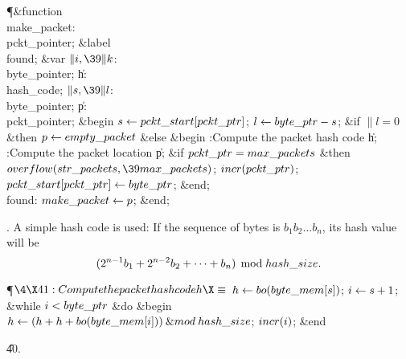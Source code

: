 \Y\P\4\&{function}\1\  \\{make\_packet}: \\{pckt\_pointer};\6
\4\&{label} \\{found};\6
\4\&{var} $\|i,\39\|k$: \\{byte\_pointer};\6
\|h: \\{hash\_code};\6
$\|s,\39\|l$: \\{byte\_pointer};\6
\|p: \\{pckt\_pointer};\2\6
\&{begin} $\|s\K\\{pckt\_start}[\\{pckt\_ptr}]$;\5
$\|l\K\\{byte\_ptr}-\|s$;\6
\&{if} $\|l=0$ \1\&{then}\5
$\|p\K\\{empty\_packet}$\6
\4\&{else} \&{begin} :Compute the packet hash code \|h\X;\6
:Compute the packet location \|p\X;\6
\&{if} $\\{pckt\_ptr}=\\{max\_packets}$ \1\&{then}\5
$\\{overflow}(\\{str\_packets},\39\\{max\_packets})$;\2\6
$\\{incr}(\\{pckt\_ptr})$;\5
$\\{pckt\_start}[\\{pckt\_ptr}]\K\\{byte\_ptr}$;\6
\&{end};\2\6
\4\\{found}: $\\{make\_packet}\K\|p$;\6
\&{end};\par
\fi

. A simple hash code is used: If the sequence of bytes is
$b_1b_2\ldots b_n$, its hash value will be
$$(2^{n-1}b_1+2^{n-2}b_2+\cdots+b_n)\,\bmod\,\\{hash\_size}.$$

\Y\P$\4\X41:Compute the packet hash code \|h\X\S$\6
$\|h\K\\{bo}(\\{byte\_mem}[\|s])$;\5
$\|i\K\|s+1$;\6
\&{while} $\|i<\\{byte\_ptr}$ \1\&{do}\6
\&{begin} $\|h\K(\|h+\|h+\\{bo}(\\{byte\_mem}[\|i]))\mathbin{\&{mod}}\\{hash%
\_size}$;\5
$\\{incr}(\|i)$;\6
\&{end}\2\par
\U40.\fi

